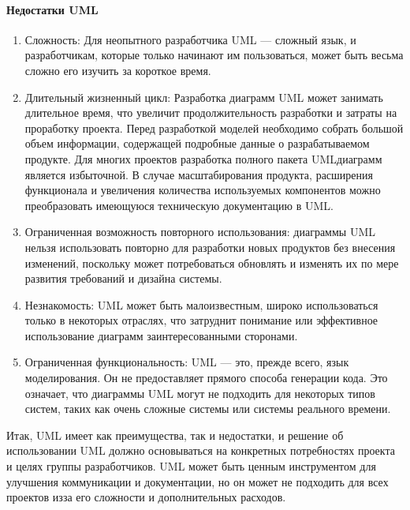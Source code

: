 \documentclass[letterpaper,10pt,russian]{sphinxmanual}
\begin{document}
\paragraph{Недостатки UML}
\label{\detokenize{educational_materials/uml/content:id8}}\begin{enumerate}
%
\item {} 
\sphinxAtStartPar
Сложность: Для неопытного разработчика UML — сложный язык, и разработчикам, которые только начинают им пользоваться, может быть весьма сложно его изучить за короткое время.

\item {} 
\sphinxAtStartPar
Длительный жизненный цикл: Разработка диаграмм UML может занимать длительное время, что увеличит продолжительность разработки и затраты на проработку проекта. Перед разработкой моделей необходимо собрать большой объем информации, содержащей подробные данные о разрабатываемом продукте. Для многих проектов разработка полного пакета UML\sphinxhyphen{}диаграмм является избыточной. В случае масштабирования продукта, расширения функционала и увеличения количества используемых компонентов можно преобразовать имеющуюся техническую документацию в UML.

\item {} 
\sphinxAtStartPar
Ограниченная возможность повторного использования: диаграммы UML нельзя использовать повторно для разработки новых продуктов без внесения изменений, поскольку может потребоваться обновлять и изменять их по мере развития требований и дизайна системы.

\item {} 
\sphinxAtStartPar
Незнакомость: UML может быть малоизвестным, широко использоваться только в некоторых отраслях, что затруднит понимание или эффективное использование диаграмм заинтересованными сторонами.

\item {} 
\sphinxAtStartPar
Ограниченная функциональность: UML — это, прежде всего, язык моделирования. Он не предоставляет прямого способа генерации кода. Это означает, что диаграммы UML могут не подходить для некоторых типов систем, таких как очень сложные системы или системы реального времени.

\end{enumerate}

\sphinxAtStartPar
Итак, UML имеет как преимущества, так и недостатки, и решение об использовании UML должно основываться на конкретных потребностях проекта и целях группы разработчиков. UML может быть ценным инструментом для улучшения коммуникации и документации, но он может не подходить для всех проектов из\sphinxhyphen{}за его сложности и дополнительных расходов.
\end{document}
